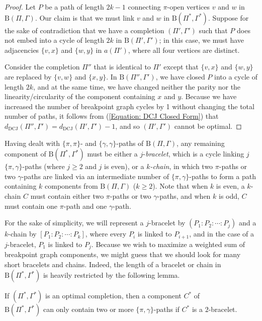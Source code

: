 \begin{proof}
Let $P$ be a path of length $2k-1$ connecting $\pi$-open vertices $v$ and $w$ in $\mathrm{B}(\Pi, \Gamma)$. Our claim is that we must link $v$ and $w$ in $\mathrm{B}(\Pi^{*}, \Gamma^{*})$.  Suppose for the sake of contradiction that we have a completion $(\Pi', \Gamma')$ such that $P$ does not embed into a cycle of length $2k$ in $\mathrm{B}(\Pi', \Gamma')$; in this case, we must have adjacencies $\{v, x\}$ and $\{w, y\}$ in $a(\Pi')$, where all four vertices are distinct.

Consider the completion $\Pi''$ that is identical to $\Pi'$ except that $\{v, x\}$ and $\{w, y\}$ are replaced by $\{v, w\}$ and $\{x, y\}$.  In $\mathrm{B}(\Pi'', \Gamma')$, we have closed $P$ into a cycle of length $2k$, and at the same time, we have changed neither the parity nor the linearity/circularity of the  component containing $x$ and $y$.  Because we have increased the number of breakpoint graph cycles by 1 without changing the total number of paths, it follows from (\ref{Equation: DCJ Closed Form}) that $d_{\mathrm{DCJ}}(\Pi'', \Gamma') = d_{\mathrm{DCJ}}(\Pi', \Gamma') - 1$, and so $(\Pi', \Gamma')$ cannot be optimal. 
\end{proof}

Having dealt with $\{\pi, \pi\}$- and $\{\gamma, \gamma\}$-paths of $\mathrm{B}(\Pi, \Gamma)$, any remaining component of $\mathrm{B}(\Pi^*, \Gamma^*)$ must be either a $j$-{\em bracelet}, which is a cycle linking $j$ $\{\pi, \gamma\}$-paths (where $j \geq 2$ and $j$ is even), or a $k${\em -chain}, in which two $\pi$-paths or two $\gamma$-paths are linked via an intermediate number of $\{\pi, \gamma\}$-paths to form a path containing $k$ components from $\mathrm{B}(\Pi, \Gamma)$ ($k \geq 2$).  Note that when $k$ is even, a $k$-chain $C$ must contain either two $\pi$-paths or two $\gamma$-paths, and when $k$ is odd, $C$ must contain one $\pi$-path and one $\gamma$-path.

For the sake of simplicity, we will represent a $j$-bracelet by $(P_1:P_2:\cdots:P_j)$ and a $k$-chain by $[P_1:P_2:\cdots:P_k]$, where every $P_i$ is linked to $P_{i+1}$, and in the case of a $j$-bracelet, $P_1$ is linked to $P_j$.  Because we wish to maximize a weighted sum of breakpoint graph components, we might guess that we should look for many short bracelets and chains.  Indeed, the length of a bracelet or chain in $\mathrm{B}(\Pi^*, \Gamma^*)$ is heavily restricted by the following lemma.

\begin{lemma}
If $(\Pi^*, \Gamma^*)$ is an optimal completion, then a component $C^*$ of\\$\mathrm{B}(\Pi^*, \Gamma^*)$ can only contain two or more $\{\pi, \gamma\}$-paths if $C^*$ is a $2$-bracelet.
\label{Lemma: Even Paths Cycles}
\end{lemma}

